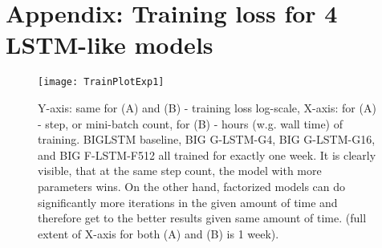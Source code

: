 \documentclass{article} \usepackage{iclr2017_workshop,times}
\begin{document}



\pagebreak
\section*{Appendix: Training loss for 4 LSTM-like models} \label{appendix}

\begin{figure}[h]
\begin{center}
\texttt{[image: TrainPlotExp1]}
\end{center}
\caption{Y-axis: same for (A) and (B) - training loss log-scale, X-axis: for (A) - step, or mini-batch count, for (B) - hours (w.g. wall time) of training. BIGLSTM baseline, BIG G-LSTM-G4, BIG G-LSTM-G16, and BIG F-LSTM-F512 all trained for exactly one week. It is clearly visible, that at the same step count, the model with more parameters wins. On the other hand, factorized models can do significantly more iterations in the given amount of time and therefore get to the better results given same amount of time. (full extent of X-axis for both (A) and (B) is 1 week).}
\label{fig:exp1plot}
\end{figure}
\end{document}
